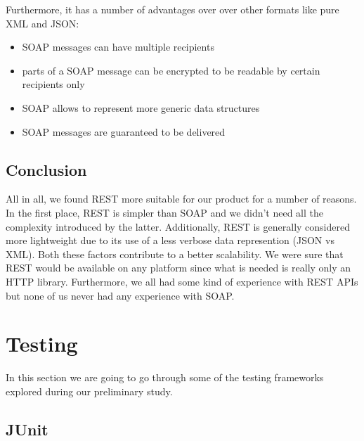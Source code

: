 Furthermore, it has a number of advantages over over other formats like pure XML and JSON:
\begin{itemize}
\item SOAP messages can have multiple recipients
\item parts of a SOAP message can be encrypted to be readable by certain recipients only
\item SOAP allows to represent more generic data structures
\item SOAP messages are guaranteed to be delivered
\end{itemize}

\subsection{Conclusion}
\label{subsec:soa-conclusion}
All in all, we found REST more suitable for our product for a number of reasons.
In the first place, REST is simpler than SOAP and we didn't need all the complexity introduced by the latter.
Additionally, REST is generally considered more lightweight due to its use of a less verbose data
represention (JSON vs XML). Both these factors contribute to a better scalability.
We were sure that REST would be available on any platform since what is needed
is really only an HTTP library. Furthermore, we all had some kind of experience with
REST APIs but none of us never had any experience with SOAP.


\section{Testing}
\label{section:testing}

In this section we are going to go through some of the testing frameworks explored during our preliminary study.

\subsection{JUnit}

